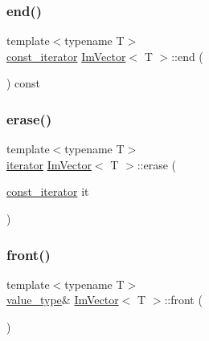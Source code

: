 \hypertarget{class_im_vector_a06efa87357864d1c130f0f400eeccf8d}{}\label{class_im_vector_a06efa87357864d1c130f0f400eeccf8d} 
\subsubsection{\texorpdfstring{end()}{end()}\hspace{0.1cm}{\footnotesize\ttfamily [2/2]}}
{\footnotesize\ttfamily template$<$typename T$>$ \\
\hyperlink{class_im_vector_aedeac9c5080f9d6ce96ae837768ee4c4}{const\+\_\+iterator} \hyperlink{class_im_vector}{Im\+Vector}$<$ T $>$\+::end (\begin{DoxyParamCaption}{ }\end{DoxyParamCaption}) const}

\hypertarget{class_im_vector_a1e1fd9b678be9d4b4432fbefde976045}{}\label{class_im_vector_a1e1fd9b678be9d4b4432fbefde976045} 
\subsubsection{\texorpdfstring{erase()}{erase()}}
{\footnotesize\ttfamily template$<$typename T$>$ \\
\hyperlink{class_im_vector_a74b5478f1f6fd471cc71219bce483db6}{iterator} \hyperlink{class_im_vector}{Im\+Vector}$<$ T $>$\+::erase (\begin{DoxyParamCaption}\item[{\hyperlink{class_im_vector_aedeac9c5080f9d6ce96ae837768ee4c4}{const\+\_\+iterator}}]{it }\end{DoxyParamCaption})}

\hypertarget{class_im_vector_a5b0108d6b1a4a11609723f8305fb9011}{}\label{class_im_vector_a5b0108d6b1a4a11609723f8305fb9011} 
\subsubsection{\texorpdfstring{front()}{front()}\hspace{0.1cm}{\footnotesize\ttfamily [1/2]}}
{\footnotesize\ttfamily template$<$typename T$>$ \\
\hyperlink{class_im_vector_a8bd77e4e7581d8e5f9e98d7c2f3c2a80}{value\+\_\+type}\& \hyperlink{class_im_vector}{Im\+Vector}$<$ T $>$\+::front (\begin{DoxyParamCaption}{ }\end{DoxyParamCaption})}

